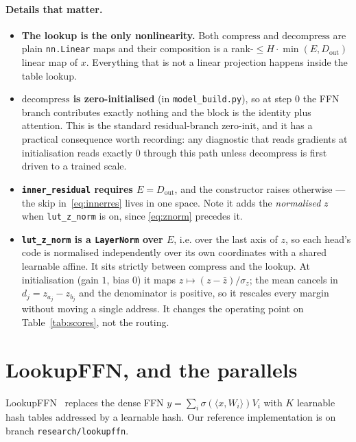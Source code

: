 \documentclass[11pt]{article}
\begin{document}
\paragraph{Details that matter.}
\begin{itemize}\itemsep2pt
\item \textbf{The lookup is the only nonlinearity.} Both $\mathrm{compress}$ and
      $\mathrm{decompress}$ are plain \texttt{nn.Linear} maps and their composition is a
      rank-$\le H\!\cdot\!\min(E,D_{\text{out}})$ linear map of $x$. Everything that is
      not a linear projection happens inside the table lookup.
\item \textbf{$\mathrm{decompress}$ is zero-initialised} (in \texttt{model\_build.py}),
      so at step 0 the FFN branch contributes exactly nothing and the block is the
      identity plus attention. This is the standard residual-branch zero-init, and it has
      a practical consequence worth recording: any diagnostic that reads gradients at
      initialisation reads exactly $0$ through this path unless $\mathrm{decompress}$ is
      first driven to a trained scale.
\item \textbf{\texttt{inner\_residual} requires $E=D_{\text{out}}$}, and the constructor
      raises otherwise --- the skip in~\eqref{eq:innerres} lives in one space. Note it
      adds the \emph{normalised} $z$ when \texttt{lut\_z\_norm} is on, since
      \eqref{eq:znorm} precedes it.
\item \textbf{\texttt{lut\_z\_norm} is a \texttt{LayerNorm} over $E$}, i.e. over the last
      axis of $z$, so each head's code is normalised independently over its own
      coordinates with a shared learnable affine. It sits strictly between
      $\mathrm{compress}$ and the lookup. At initialisation (gain $1$, bias $0$) it maps
      $z\mapsto(z-\bar z)/\sigma_z$; the mean cancels in $d_j=z_{a_j}-z_{b_j}$ and the
      denominator is positive, so it rescales every margin without moving a single
      address. It changes the operating point on Table~\ref{tab:scores}, not the routing.
\end{itemize}

\section{LookupFFN, and the parallels}

LookupFFN~\cite{lookupffn} replaces the dense FFN
$y=\sum_i \sigma(\langle x,W_i\rangle)V_i$ with $K$ learnable hash tables addressed by a
learnable hash. Our reference implementation is
 on branch \texttt{research/lookupffn}.
\end{document}
